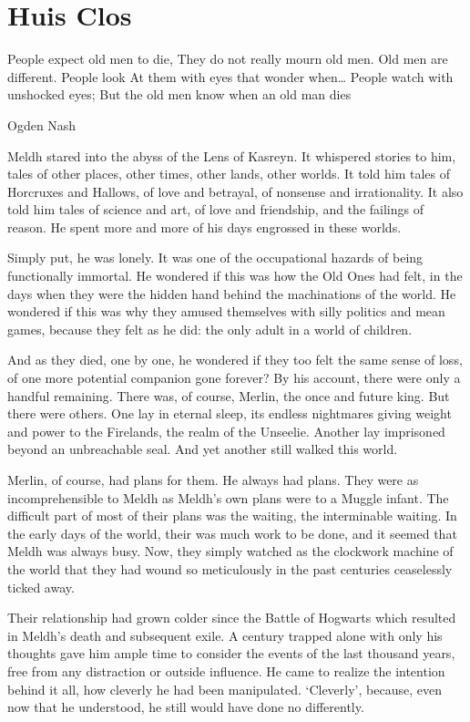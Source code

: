 \chapter{Huis Clos}
People expect old men to die,
They do not really mourn old men.
Old men are different. People look
At them with eyes that wonder when…
People watch with unshocked eyes;
But the old men know when an old man dies

Ogden Nash
\simpleline

Meldh stared into the abyss of the Lens of Kasreyn. It whispered stories to him, tales of other places, other times, other lands, other worlds. It told him tales of Horcruxes and Hallows, of love and betrayal, of nonsense and irrationality. It also told him tales of science and art, of love and friendship, and the failings of reason. He spent more and more of his days engrossed in these worlds.

Simply put, he was lonely. It was one of the occupational hazards of being functionally immortal. He wondered if this was how the Old Ones had felt, in the days when they were the hidden hand behind the machinations of the world. He wondered if this was why they amused themselves with silly politics and mean games, because they felt as he did: the only adult in a world of children.

And as they died, one by one, he wondered if they too felt the same sense of loss, of one more potential companion gone forever? By his account, there were only a handful remaining. There was, of course, Merlin, the once and future king. But there were others. One lay in eternal sleep, its endless nightmares giving weight and power to the Firelands, the realm of the Unseelie. Another lay imprisoned beyond an unbreachable seal. And yet another still walked this world.

Merlin, of course, had plans for them. He always had plans. They were as incomprehensible to Meldh as Meldh’s own plans were to a Muggle infant. The difficult part of most of their plans was the waiting, the interminable waiting. In the early days of the world, their was much work to be done, and it seemed that Meldh was always busy. Now, they simply watched as the clockwork machine of the world that they had wound so meticulously in the past centuries ceaselessly ticked away.

Their relationship had grown colder since the Battle of Hogwarts which resulted in Meldh’s death and subsequent exile. A century trapped alone with only his thoughts gave him ample time to consider the events of the last thousand years, free from any distraction or outside influence. He came to realize the intention behind it all, how cleverly he had been manipulated. ‘Cleverly’, because, even now that he understood, he still would have done no differently.

